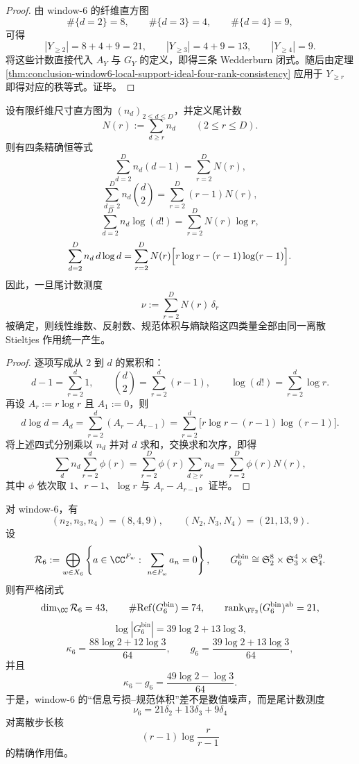 \begin{proof}
由 window-\(6\) 的纤维直方图
\[
\#\{d=2\}=8,\qquad
\#\{d=3\}=4,\qquad
\#\{d=4\}=9,
\]
可得
\[
|Y_{\ge2}|=8+4+9=21,
\qquad
|Y_{\ge3}|=4+9=13,
\qquad
|Y_{\ge4}|=9.
\]
将这些计数直接代入 \(A_Y\) 与 \(G_Y\) 的定义，即得三条 Wedderburn 闭式。随后由定理 \ref{thm:conclusion-window6-local-support-ideal-four-rank-consistency} 应用于 \(Y_{\ge r}\) 即得对应的秩等式。证毕。
\end{proof}

\begin{theorem}\label{thm:conclusion-window6-tail-count-discrete-abel-stieltjes-action}
设有限纤维尺寸直方图为 \((n_d)_{2\le d\le D}\)，并定义尾计数
\[
N(r):=\sum_{d\ge r}n_d
\qquad (2\le r\le D).
\]
则有四条精确恒等式
\[
\sum_{d=2}^{D} n_d(d-1)=\sum_{r=2}^{D} N(r),
\]
\[
\sum_{d=2}^{D} n_d\binom d2=\sum_{r=2}^{D}(r-1)N(r),
\]
\[
\sum_{d=2}^{D} n_d\log(d!)=\sum_{r=2}^{D}N(r)\log r,
\]
\[
\sum_{d=2}^{D} n_d\, d\log d
=
\sum_{r=2}^{D}N(r)\Bigl[r\log r-(r-1)\log(r-1)\Bigr].
\]
因此，一旦尾计数测度
\[
\nu:=\sum_{r=2}^{D}N(r)\,\delta_r
\]
被确定，则线性维数、反射数、规范体积与熵缺陷这四类量全部由同一离散 Stieltjes 作用统一产生。
\end{theorem}

\begin{proof}
逐项写成从 \(2\) 到 \(d\) 的累积和：
\[
d-1=\sum_{r=2}^{d}1,
\qquad
\binom d2=\sum_{r=2}^{d}(r-1),
\qquad
\log(d!)=\sum_{r=2}^{d}\log r.
\]
再设 \(A_r:=r\log r\) 且 \(A_1:=0\)，则
\[
d\log d=A_d=\sum_{r=2}^{d}(A_r-A_{r-1})
=\sum_{r=2}^{d}\bigl[r\log r-(r-1)\log(r-1)\bigr].
\]
将上述四式分别乘以 \(n_d\) 并对 \(d\) 求和，交换求和次序，即得
\[
\sum_d n_d\sum_{r=2}^{d}\phi(r)
=
\sum_{r=2}^{D}\phi(r)\sum_{d\ge r}n_d
=
\sum_{r=2}^{D}\phi(r)N(r),
\]
其中 \(\phi\) 依次取 \(1\)、\(r-1\)、\(\log r\) 与 \(A_r-A_{r-1}\)。证毕。
\end{proof}

\begin{corollary}\label{cor:conclusion-window6-gauge-entropy-constants-from-tail-measure}
对 window-\(6\)，有
\[
(n_2,n_3,n_4)=(8,4,9),
\qquad
(N_2,N_3,N_4)=(21,13,9).
\]
设
\[
\mathcal R_6:=\bigoplus_{w\in X_6}\left\{a\in \CC^{F_w}:\ \sum_{n\in F_w}a_n=0\right\},
\qquad
G_6^{\mathrm{bin}}\cong \mathfrak S_2^{8}\times \mathfrak S_3^{4}\times \mathfrak S_4^{9}.
\]
则有严格闭式
\[
\dim_{\CC}\mathcal R_6=43,
\qquad
\#\mathrm{Ref}(G_6^{\mathrm{bin}})=74,
\qquad
\operatorname{rank}_{\FF_2}(G_6^{\mathrm{bin}})^{\mathrm{ab}}=21,
\]
\[
\log|G_6^{\mathrm{bin}}|
=
39\log 2+13\log 3,
\]
\[
\kappa_6=\frac{88\log 2+12\log 3}{64},
\qquad
g_6=\frac{39\log 2+13\log 3}{64},
\]
并且
\[
\kappa_6-g_6=\frac{49\log 2-\log 3}{64}.
\]
于是，window-\(6\) 的“信息亏损--规范体积”差不是数值噪声，而是尾计数测度
\[
\nu_6=21\delta_2+13\delta_3+9\delta_4
\]
对离散步长核
\[
(r-1)\log\frac{r}{r-1}
\]
的精确作用值。
\end{corollary}

